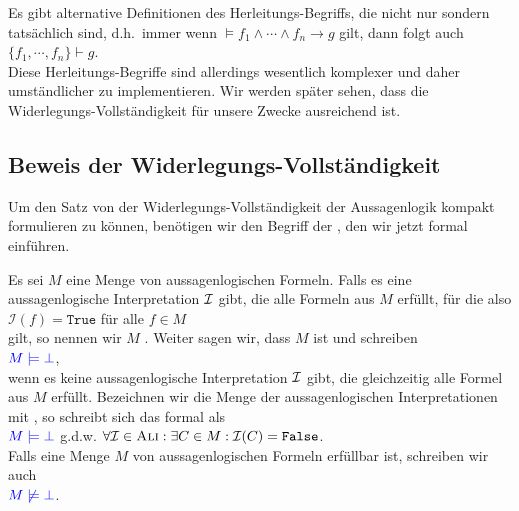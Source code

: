 \remark
Es gibt alternative Definitionen des Herleitungs-Begriffs, die nicht nur  sondern
tatsächlich  sind, d.h.~immer wenn $\models f_1 \wedge \cdots \wedge f_n \rightarrow g$ gilt,
dann folgt auch
\\[0.2cm]
\hspace*{1.3cm}
$\{ f_1, \cdots, f_n \} \vdash g$.
\\[0.2cm]  
Diese Herleitungs-Begriffe sind allerdings wesentlich komplexer und daher umständlicher zu implementieren.  Wir
werden später sehen, dass die Widerlegungs-Vollständigkeit für unsere Zwecke ausreichend ist.
\eox

\subsection{Beweis der Widerlegungs-Vollständigkeit}
Um den Satz von der Widerlegungs-Vollständigkeit der Aussagenlogik kompakt formulieren zu können, benötigen wir
den Begriff der , den wir jetzt formal einführen. 

\begin{Definition}[Erfüllbarkeit] 
  Es sei $M$ eine Menge von aussagenlogischen Formeln.
  Falls es eine aussagen\-logische Interpretation $\mathcal{I}$ gibt, die alle Formeln aus $M$ erfüllt, für die also
  \\[0.2cm]
  \hspace*{1.3cm}
  $\mathcal{I}(f) = \texttt{True}$ \quad für alle $f \in M$
  \\[0.2cm]
  gilt, so nennen wir $M$ .  Weiter sagen wir, dass $M$ 
  ist und schreiben 
  \\[0.2cm]
  \hspace*{1.3cm}
  ${\color{blue}M \models \bot}$, 
  \\[0.2cm]
  wenn es keine aussagenlogische Interpretation $\mathcal{I}$ gibt, die gleichzeitig alle Formel aus $M$ erfüllt.
  Be\-zeichnen wir die Menge der aussagenlogischen Interpretationen mit
  \textsc{}, so schreibt sich das formal als
  \\[0.2cm]
  \hspace*{1.3cm}
  ${\color{blue}M \models \bot}$ \quad g.d.w. \quad 
  $\forall \mathcal{I} \in \textsc{Ali}: \exists C \in M: \mathcal{I}(C) = \texttt{False}$.
  \\[0.2cm]
  Falls eine Menge $M$ von aussagenlogischen Formeln erfüllbar ist, schreiben wir auch
  \\[0.2cm]
  \hspace*{1.3cm}
  ${\color{blue}M \not\models \bot}$.
  \eox
\end{Definition}

